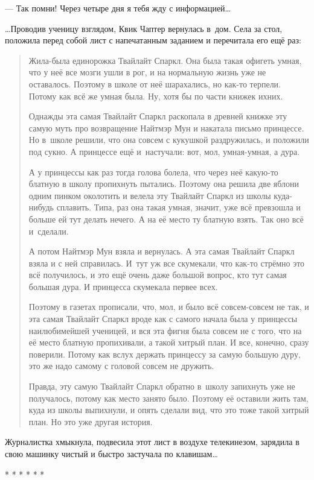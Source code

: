 \documentclass[fontsize=11pt,a5paper,titlepage=firstcover]{scrbook}
\begin{document}
--- Так помни! Через четыре дня я тебя жду с информацией{\ldots}

{\ldots}Проводив ученицу взглядом, Квик Чаптер вернулась в~дом. Села за стол, положила перед собой лист с напечатанным заданием и перечитала его ещё раз:
\begin{quotation}
Жила-была единорожка Твайлайт Спаркл. Она была такая офигеть умная, что у неё все мозги ушли в рог, и на нормальную жизнь уже не оставалось. Поэтому в школе от неё шарахались, но как-то терпели. Потому как всё же умная была. Ну, хотя бы по части книжек ихних.

Однажды эта самая Твайлайт Спаркл раскопала в древней книжке эту самую муть про возвращение Найтмэр Мун и накатала письмо принцессе. Но в~школе решили, что она совсем с кукушкой раздружилась, и положили под сукно. А принцессе ещё и~настучали: вот, мол, умная-умная, а дура.

А у принцессы как раз тогда голова болела, что через неё какую-то блатную в школу пропихнуть пытались. Поэтому она решила две яблони одним пинком околотить и велела эту Твайлайт Спаркл из школы куда-нибудь сплавить. Типа, раз она такая умная, значит, уже всё превзошла и больше ей тут делать нечего. А на её место ту блатную взять. Так оно всё и~сделали.

А потом Найтмэр Мун взяла и вернулась. А эта самая Твайлайт Спаркл взяла и с ней справилась. И~тут уж все скумекали, что как-то стрёмно это всё получилось, и это ещё очень даже большой вопрос, кто тут самая большая дура. И принцесса скумекала первее всех.

Поэтому в газетах прописали, что, мол, и было всё  совсем-совсем не так, и эта самая Твайлайт Спаркл вроде как с самого начала была у принцессы наилюбимейшей ученицей, и вся эта фигня была совсем не с того, что на её место блатную пропихивали, а такой хитрый план. И все, конечно, сразу поверили. Потому как вслух держать принцессу за самую большую дуру, это же надо самому с головой совсем не дружить.

Правда, эту самую Твайлайт Спаркл обратно в~школу запихнуть уже не получалось, потому как место занято было. Поэтому её оставили жить там, куда из школы выпихнули, и опять сделали вид, что это тоже такой хитрый план. Но это уже другая история.
\end{quotation}
Журналистка хмыкнула, подвесила этот лист в воздухе телекинезом, зарядила в свою машинку чистый и быстро застучала по клавишам{\ldots}
\begin{center}* * * * * *\end{center}
\end{document}
